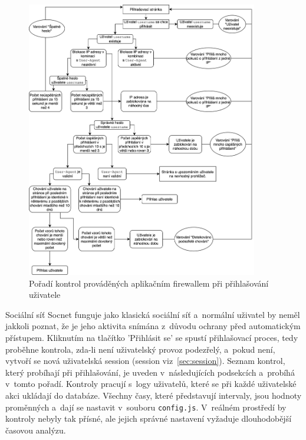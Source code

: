 \begin{figure}[ht]
	\centering
	\includegraphics[width=0.9\textwidth]{images/program_scheme.jpg}
	\caption{Pořadí kontrol prováděných aplikačním firewallem při přihlašování uživatele}
	\label{img:program_scheme}
\end{figure}

Sociální síť Socnet funguje jako klasická sociální síť a~normální uživatel by neměl jakkoli poznat, že je jeho aktivita snímána z~důvodu ochrany před automatickým přístupem. Kliknutím na tlačítko 'Přihlásit se' se spustí přihlašovací proces, tedy proběhne kontrola, zda-li není uživatelský provoz podezřelý, a~pokud není, vytvoří se nová uživatelská session (session viz~\ref{sec:session}). Seznam kontrol, který probíhají při přihlašování, je uveden v~následujících podsekcích a~probíhá v~tomto pořadí. Kontroly pracují s~logy uživatelů, které se při každé uživatelské akci ukládají do databáze. Všechny časy, které představují intervaly, jsou hodnoty proměnných a~dají se nastavit v~souboru \texttt{config.js}. V~reálném prostředí by kontroly nebyly tak přísné, ale jejich správné nastavení vyžaduje dlouhodobější časovou analýzu.

